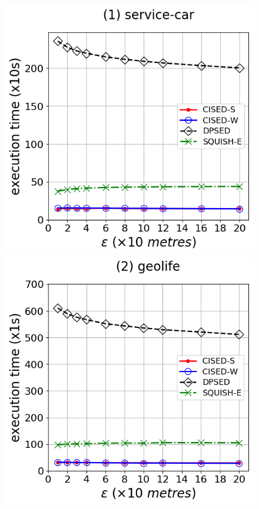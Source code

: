 {\begin{figure}[tb!]
\centering
\includegraphics[scale = 0.275]{Figures/Exp-time-epsilon-service.png}\hspace{3ex}
\includegraphics[scale = 0.275]{Figures/Exp-time-epsilon-geolife.png}\hspace{3ex}

\end{figure}}

